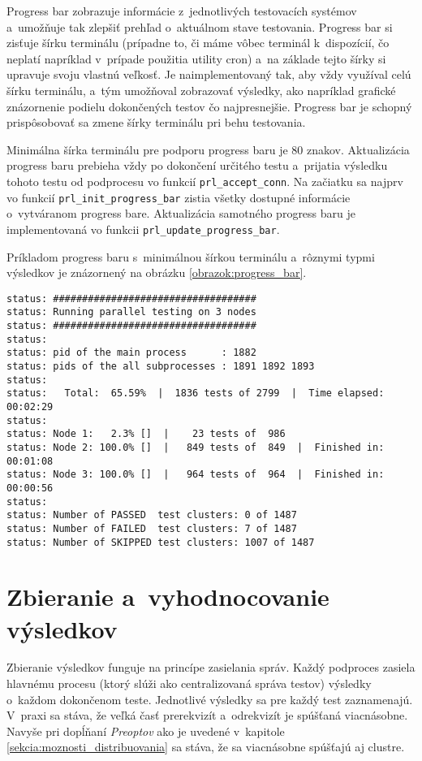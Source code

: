 Progress bar zobrazuje informácie z~jednotlivých testovacích systémov 
a~umožňuje tak zlepšiť prehľad o~aktuálnom stave testovania. 
Progress bar si zisťuje šírku terminálu (prípadne to, či máme vôbec 
terminál k~dispozícií, čo neplatí napríklad v~prípade použitia utility cron) 
a~na základe tejto šírky si upravuje svoju vlastnú veľkosť.
Je naimplementovaný tak, aby vždy využíval celú šírku terminálu, a~tým
umožňoval zobrazovať výsledky, ako napríklad grafické znázornenie podielu
dokončených testov čo najpresnejšie. Progress bar je schopný prispôsobovať
sa zmene šírky terminálu pri behu testovania.

Minimálna šírka terminálu pre podporu progress baru je 80 znakov.
Aktualizácia progress baru prebieha vždy po dokončení určitého testu
a~prijatia výsledku tohoto testu od podprocesu vo funkcií 
\texttt{prl\_accept\_conn}. Na začiatku sa najprv vo funkcií 
\texttt{prl\_init\_progress\_bar} zistia všetky dostupné
informácie o~vytváranom progress bare. 
Aktualizácia samotného progress baru je implementovaná vo funkcii 
\texttt{prl\_update\_progress\_bar}.

Príkladom progress baru s~minimálnou šírkou terminálu a~rôznymi 
typmi výsledkov je znázornený na obrázku
\ref{obrazok:progress_bar}.

\begin{lstlisting}[caption=Ukážka progress baru so šírkou terminálu 
80 znakov,label=obrazok:progress_bar]
status: ###################################
status: Running parallel testing on 3 nodes
status: ###################################
status: 
status: pid of the main process      : 1882
status: pids of the all subprocesses : 1891 1892 1893
status: 
status:   Total:  65.59%  |  1836 tests of 2799  |  Time elapsed: 00:02:29      
status:                                                                         
status: Node 1:   2.3% []  |    23 tests of  986                                
status: Node 2: 100.0% []  |   849 tests of  849  |  Finished in: 00:01:08      
status: Node 3: 100.0% []  |   964 tests of  964  |  Finished in: 00:00:56      
status:                                                                         
status: Number of PASSED  test clusters: 0 of 1487                              
status: Number of FAILED  test clusters: 7 of 1487                              
status: Number of SKIPPED test clusters: 1007 of 1487
\end{lstlisting}


\section{Zbieranie a~vyhodnocovanie výsledkov}
\label{sekcia:zbieranie_vysledkov}
Zbieranie výsledkov funguje na princípe zasielania správ. 
Každý podproces zasiela hlavnému procesu (ktorý slúži ako centralizovaná
správa testov) výsledky o~každom dokončenom teste. Jednotlivé výsledky sa
pre každý test zaznamenajú. V~praxi sa stáva, že veľká časť prerekvizít
a~odrekvizít je spúšťaná viacnásobne. Navyše pri dopĺňaní \textit{Preoptov}
ako je uvedené v~kapitole \ref{sekcia:moznosti_distribuovania} sa stáva, 
že sa viacnásobne spúšťajú aj clustre. 

